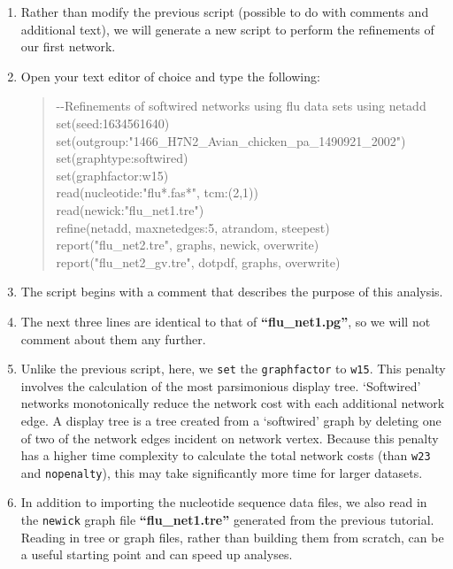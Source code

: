 \documentclass[11pt]{article}
\begin{document}
\begin {enumerate}

\item Rather than modify the previous script (possible to do with comments and 
additional text), we will generate a new script to perform the refinements of our
first network.

\item Open your text editor of choice and type the following:

	\begin{quote}	
	-\/-Refinements of softwired networks using flu data sets using netadd\\
	set(seed:1634561640)\\
	set(outgroup:"1466\_H7N2\_Avian\_chicken\_pa\_1490921\_2002")\\
	set(graphtype:softwired)\\
	set(graphfactor:w15)\\ 
	read(nucleotide:"flu*.fas*", tcm:(2,1))\\
	read(newick:"flu\_net1.tre")\\
	refine(netadd, maxnetedges:5, atrandom, steepest)\\
	report("flu\_net2.tre", graphs, newick, overwrite)\\
	report("flu\_net2\_gv.tre", dotpdf, graphs, overwrite)
	\end{quote}

\item The script begins with a comment that describes the purpose of this 
analysis.

\item The next three lines are identical to that of \textbf{``flu\_net1.pg''}, so we 
will not comment about them any further. 

\item Unlike the previous script, here, we \texttt{set} the \texttt{graphfactor} to 
\texttt{w15}. This penalty involves the calculation of the most parsimonious 
display tree. `Softwired' networks monotonically reduce the network cost 
with each additional network edge. A display tree is a tree created from a 
`softwired' graph by deleting one of two of the network edges incident on 
network vertex. Because this penalty has a higher time complexity to calculate 
the total network costs (than \texttt{w23} and \texttt{nopenalty}), this may take 
significantly more time for larger datasets. 

\item In addition to importing the nucleotide sequence data files, we also
read in the \texttt{newick} graph file \textbf{``flu\_net1.tre''} generated from the 
previous tutorial. Reading in tree or graph files, rather than building them from 
scratch, can be a useful starting point and can speed up analyses.


\end{enumerate}
\end{document}
